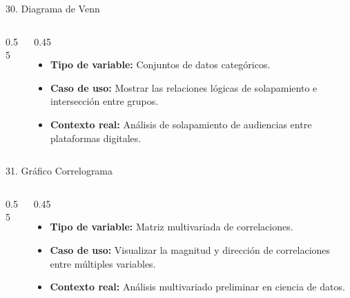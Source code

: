 \documentclass[aspectratio=169,10pt]{beamer}
\begin{document}
\begin{frame}{30. Diagrama de Venn}
\begin{columns}
\begin{column}{0.55\textwidth}
\end{column}
\begin{column}{0.45\textwidth}
\begin{itemize}\small
\item \textbf{Tipo de variable:} Conjuntos de datos categóricos.
\item \textbf{Caso de uso:} Mostrar las relaciones lógicas de solapamiento e intersección entre grupos.
\item \textbf{Contexto real:} Análisis de solapamiento de audiencias entre plataformas digitales.
\end{itemize}
\end{column}
\end{columns}
\end{frame}

\begin{frame}{31. Gráfico Correlograma}
\begin{columns}
\begin{column}{0.55\textwidth}
\end{column}
\begin{column}{0.45\textwidth}
\begin{itemize}\small
\item \textbf{Tipo de variable:} Matriz multivariada de correlaciones.
\item \textbf{Caso de uso:} Visualizar la magnitud y dirección de correlaciones entre múltiples variables.
\item \textbf{Contexto real:} Análisis multivariado preliminar en ciencia de datos.
\end{itemize}
\end{column}
\end{columns}
\end{frame}
\end{document}

